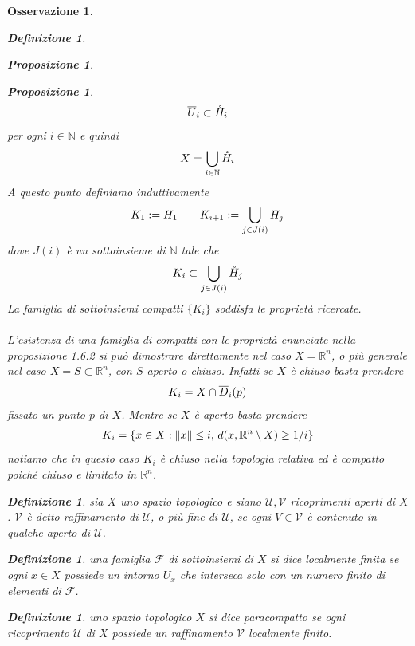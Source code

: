 \documentclass[oneside, 11pt]{amsbook}
\makeatletter
\newcommand{\0}{{(0)}}
\newcommand{\3}{{(3)}}
\theoremstyle{colonplain}
\newtheorem{prop}[thm]{Proposizione}
\theoremstyle{colondefinition}
\newtheorem{defn}[thm]{Definizione}
\theoremstyle{colonremark}
\newtheorem{rmk}[thm]{Osservazione}
\numberwithin{equation}{chapter}
\renewcommand{\proofname}{Dimostrazione}
\renewenvironment{proof}[1][\proofname]{\par
  \pushQED{\end{proof}}%
  \normalfont \topsep6\p@\@plus6\p@\relax
  \trivlist
  \item[\hskip\labelsep\bfseries #1:]\ignorespaces
}{%
  \popQED\endtrivlist\@endpefalse
}
\makeatother
\begin{document}
\begin{rmk}
\begin{defn}
\begin{prop}
\begin{prop}
\begin{proof}
\begin{align}
    \overline{U}_i \subset \mathring{H}_i \notag
\end{align}
per ogni $i \in \mathbb{N}$ e quindi
\begin{align}
    X = \bigcup_{i \in \mathbb{N}}\mathring{H}_i \notag
\end{align}
A questo punto definiamo induttivamente
\begin{align}
    K_1 := H_1 \qquad K_{i + 1} := \bigcup_{j \in J(i)}H_j \notag
\end{align}
dove $J(i)$ è un sottoinsieme di $\mathbb{N}$ tale che
\begin{align}
    K_i \subset \bigcup_{j \in J(i)}\mathring{H}_j \notag
\end{align}
La famiglia di sottoinsiemi compatti $\{K_i\}$ soddisfa le proprietà ricercate. \\ \\
L'esistenza di una famiglia di compatti con le proprietà enunciate nella \textit{proposizione 1.6.2} si può dimostrare direttamente nel caso $X = \mathbb{R}^n$, o più generale nel caso $X = S \subset \mathbb{R}^n$, con $S$ aperto o chiuso. Infatti se $X$ è chiuso basta prendere
\begin{align}
    K_i = X \cap \overline{D}_i(p) \notag
\end{align}
fissato un punto $p$ di $X$. Mentre se $X$ è aperto basta prendere
\begin{align}
    K_i = \{x \in X : \|x\| \leq i, \, d(x, \mathbb{R}^n \setminus X) \geq 1/i\} \notag
\end{align}
notiamo che in questo caso $K_i$ è chiuso nella topologia relativa ed è compatto poiché chiuso e limitato in $\mathbb{R}^n$.
\end{proof}
\begin{defn}
sia $X$ uno spazio topologico e siano $\mathcal{U}, \mathcal{V}$ ricoprimenti aperti di $X$. $\mathcal{V}$ è detto \textit{raffinamento} di $\mathcal{U}$, o \textit{più fine} di $\mathcal{U}$, se ogni $V \in \mathcal{V}$ è contenuto in qualche aperto di $\mathcal{U}$.
\end{defn}
\begin{defn}
una famiglia $\mathcal{F}$ di sottoinsiemi di $X$ si dice \textit{localmente finita} se ogni $x \in X$ possiede un intorno $U_x$ che interseca solo con un numero finito di elementi di $\mathcal{F}$.
\end{defn}
\begin{defn}
uno spazio topologico $X$ si dice \textit{paracompatto} se ogni ricoprimento $\mathcal{U}$ di $X$ possiede un raffinamento $\mathcal{V}$ localmente finito.

\end{defn}
\end{prop}
\end{prop}
\end{defn}
\end{rmk}
\end{document}
